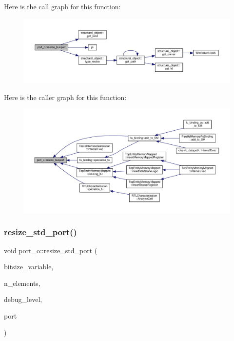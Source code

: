 Here is the call graph for this function\+:
\nopagebreak
\begin{figure}[H]
\begin{center}
\leavevmode
\includegraphics[width=350pt]{df/d75/structport__o_a4ad62789833bedbad40db7f2dba65fc6_cgraph}
\end{center}
\end{figure}
Here is the caller graph for this function\+:
\nopagebreak
\begin{figure}[H]
\begin{center}
\leavevmode
\includegraphics[width=350pt]{df/d75/structport__o_a4ad62789833bedbad40db7f2dba65fc6_icgraph}
\end{center}
\end{figure}
\mbox{\label{structport__o_a43892ca0faac40059791c7a5e6235df5}} 
\subsubsection{\texorpdfstring{resize\+\_\+std\+\_\+port()}{resize\_std\_port()}}
{\footnotesize\ttfamily void port\+\_\+o\+::resize\+\_\+std\+\_\+port (\begin{DoxyParamCaption}\item[{unsigned int}]{bitsize\+\_\+variable,  }\item[{unsigned int}]{n\+\_\+elements,  }\item[{int}]{debug\+\_\+level,  }\item[{\hyperlink{structural__objects_8hpp_a8ea5f8cc50ab8f4c31e2751074ff60b2}{structural\+\_\+object\+Ref}}]{port }\end{DoxyParamCaption})\hspace{0.3cm}{\ttfamily [static]}}



